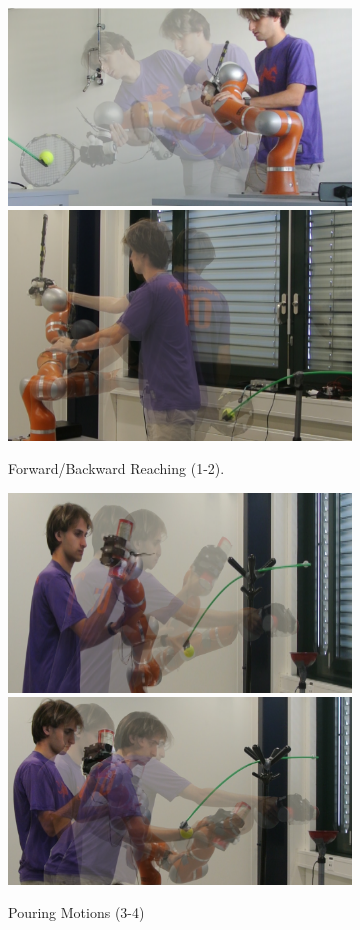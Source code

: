 \documentclass[letterpaper, 10 pt, conference,fleqn]{ieeeconf}
\begin{document}
\begin{figure}[!ht]
  \begin{minipage}[b]{0.31\textwidth}
	\centering	
		\begin{subfigure}[t]{\linewidth}
		\centering
			\includegraphics[width=0.5\linewidth]{../new-pics/forehand_crop.png}\hspace{5pt}\includegraphics[width=0.43\linewidth]{../new-pics/backhand_crop.png}
					\caption{Forward/Backward Reaching (1-2).\label{fig:forback}}
		\end{subfigure}
		\begin{subfigure}[t]{\linewidth}
\centering
	\includegraphics[width=0.45\linewidth]{../new-pics/pour-free_crop.png}\hspace{5pt}\includegraphics[width=0.477\linewidth]{../new-pics/pour-obst_crop.png}
						\caption{ Pouring Motions (3-4)}
			\end{subfigure}
			\begin{subfigure}[t]{\linewidth}		
\centering

\end{subfigure}
\end{minipage}
\end{figure}
\end{document}
